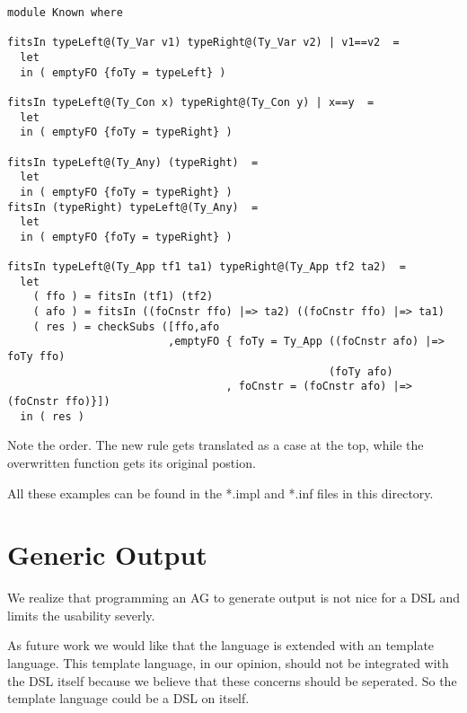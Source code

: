 \documentclass[10pt]{article}
\begin{document}
\begin{verbatim}
module Known where

fitsIn typeLeft@(Ty_Var v1) typeRight@(Ty_Var v2) | v1==v2  =
  let
  in ( emptyFO {foTy = typeLeft} )

fitsIn typeLeft@(Ty_Con x) typeRight@(Ty_Con y) | x==y  =
  let
  in ( emptyFO {foTy = typeRight} )

fitsIn typeLeft@(Ty_Any) (typeRight)  =
  let
  in ( emptyFO {foTy = typeRight} )
fitsIn (typeRight) typeLeft@(Ty_Any)  =
  let
  in ( emptyFO {foTy = typeRight} )

fitsIn typeLeft@(Ty_App tf1 ta1) typeRight@(Ty_App tf2 ta2)  =
  let
    ( ffo ) = fitsIn (tf1) (tf2) 
    ( afo ) = fitsIn ((foCnstr ffo) |=> ta2) ((foCnstr ffo) |=> ta1) 
    ( res ) = checkSubs ([ffo,afo
                         ,emptyFO { foTy = Ty_App ((foCnstr afo) |=> foTy ffo) 
                                                  (foTy afo)
                                  , foCnstr = (foCnstr afo) |=> (foCnstr ffo)}]) 
  in ( res )
\end{verbatim}

Note the order. The new rule gets translated as a case at the top, while the overwritten function gets its original postion.

All these examples can be found in the *.impl and *.inf files in this directory.

\section{Generic Output}
We realize that programming an AG to generate output is not nice for a DSL and limits the usability severly. 

As future work we would like that the language is extended with an template language. This template language, in our opinion, should not be integrated with the DSL itself because we believe that these concerns should be seperated. So the template language could be a DSL on itself.
\end{document}
